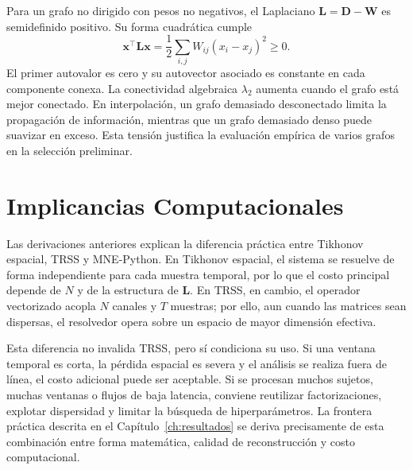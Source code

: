 Para un grafo no dirigido con pesos no negativos, el Laplaciano $\mathbf{L}=\mathbf{D}-\mathbf{W}$ es semidefinido positivo. Su forma cuadrática cumple
\begin{equation}
\mathbf{x}^{\top}\mathbf{L}\mathbf{x}=\frac{1}{2}\sum_{i,j}W_{ij}(x_i-x_j)^2\geq 0.
\end{equation}
El primer autovalor es cero y su autovector asociado es constante en cada componente conexa. La conectividad algebraica $\lambda_2$ aumenta cuando el grafo está mejor conectado. En interpolación, un grafo demasiado desconectado limita la propagación de información, mientras que un grafo demasiado denso puede suavizar en exceso. Esta tensión justifica la evaluación empírica de varios grafos en la selección preliminar.

\section{Implicancias Computacionales}

Las derivaciones anteriores explican la diferencia práctica entre Tikhonov espacial, TRSS y MNE-Python. En Tikhonov espacial, el sistema se resuelve de forma independiente para cada muestra temporal, por lo que el costo principal depende de $N$ y de la estructura de $\mathbf{L}$. En TRSS, en cambio, el operador vectorizado acopla $N$ canales y $T$ muestras; por ello, aun cuando las matrices sean dispersas, el resolvedor opera sobre un espacio de mayor dimensión efectiva.

Esta diferencia no invalida TRSS, pero sí condiciona su uso. Si una ventana temporal es corta, la pérdida espacial es severa y el análisis se realiza fuera de línea, el costo adicional puede ser aceptable. Si se procesan muchos sujetos, muchas ventanas o flujos de baja latencia, conviene reutilizar factorizaciones, explotar dispersidad y limitar la búsqueda de hiperparámetros. La frontera práctica descrita en el Capítulo~\ref{ch:resultados} se deriva precisamente de esta combinación entre forma matemática, calidad de reconstrucción y costo computacional.
